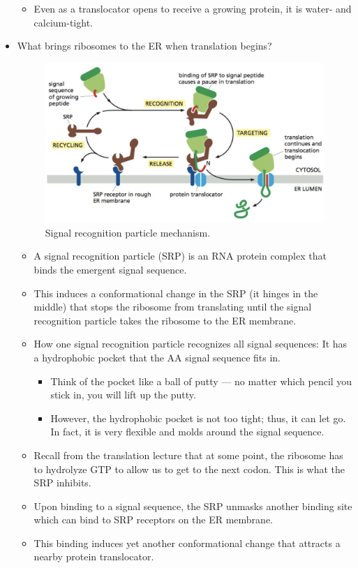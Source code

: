 \documentclass[../notes.tex]{subfiles}
\begin{document}
\begin{itemize}
\begin{itemize}
        \item Even as a translocator opens to receive a growing protein, it is water- and calcium-tight.
    \end{itemize}
    \item What brings ribosomes to the ER when translation begins?
    \begin{figure}[h!]
        \centering
        \includegraphics[width=0.55\linewidth]{../ExtFiles/SRPactivity.png}
        \caption{Signal recognition particle mechanism.}
        \label{fig:SRPactivity}
    \end{figure}
    \begin{itemize}
        \item A signal recognition particle (SRP) is an RNA protein complex that binds the emergent signal sequence.
        \item This induces a conformational change in the SRP (it hinges in the middle) that stops the ribosome from translating until the signal recognition particle takes the ribosome to the ER membrane.
        \item How one signal recognition particle recognizes all signal sequences: It has a hydrophobic pocket that the AA signal sequence fits in.
        \begin{itemize}
            \item Think of the pocket like a ball of putty --- no matter which pencil you stick in, you will lift up the putty.
            \item However, the hydrophobic pocket is not too tight; thus, it can let go. In fact, it is very flexible and molds around the signal sequence.
        \end{itemize}
        \item Recall from the translation lecture that at some point, the ribosome has to hydrolyze GTP to allow us to get to the next codon. This is what the SRP inhibits.
        \item Upon binding to a signal sequence, the SRP unmasks another binding site which can bind to SRP receptors on the ER membrane.
        \item This binding induces yet another conformational change that attracts a nearby protein translocator.

\end{itemize}
\end{itemize}
\end{document}
